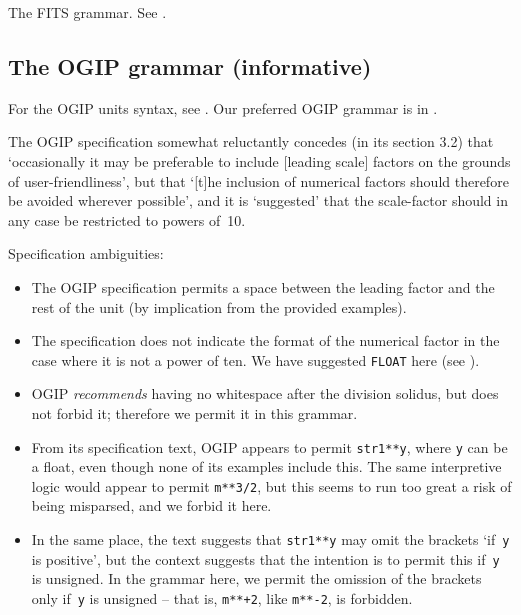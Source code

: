 \documentclass[11pt,a4paper]{ivoa}
\begin{document}
\clearpage
\begin{table}[t]

\caption[The FITS grammar]{\label{tabx:fitsgrammar}The FITS grammar.
See .}
\end{table}
\clearpage

\subsection{The OGIP grammar (informative)}
\label{appx:ogipgrammar}

For the OGIP units syntax, see \cite{george95}.  Our preferred OGIP
grammar is in .

The OGIP specification somewhat reluctantly concedes (in its section
3.2) that `occasionally it may be preferable to include [leading
scale] factors on the grounds of user-friendliness', but that `[t]he
inclusion of numerical factors should therefore be avoided wherever
possible', and it is `suggested' that the scale-factor should in any case
be restricted to powers of~10.

Specification ambiguities:
\begin{itemize}
\item The OGIP specification permits a space between the leading
  factor and the rest of the unit (by implication from the provided
  examples).
\item The specification does not indicate the format of the numerical
  factor in the case where it is not a power of ten.  We have
  suggested \texttt{FLOAT} here (see ).
\item OGIP \emph{recommends} having no whitespace after the division
  solidus, but does not forbid it; therefore we permit it in this
  grammar.
\item From its specification text, OGIP appears to permit
  \texttt{str1**y}, where \texttt{y} can be a float, even though none
  of its examples include this.  The same interpretive logic would
  appear to permit \texttt{m**3/2}, but this seems to run too great a
  risk of being misparsed, and we forbid it here.
\item In the same place, the text suggests that \texttt{str1**y} may
  omit the brackets `if~\texttt y is positive', but the context
  suggests that the intention is to permit this if~\texttt y is
  unsigned.  In the grammar here, we permit the omission of the
  brackets only if~\texttt y is unsigned -- that is, \texttt{m**+2},
  like \texttt{m**-2}, is forbidden.
\end{itemize}
\end{document}
